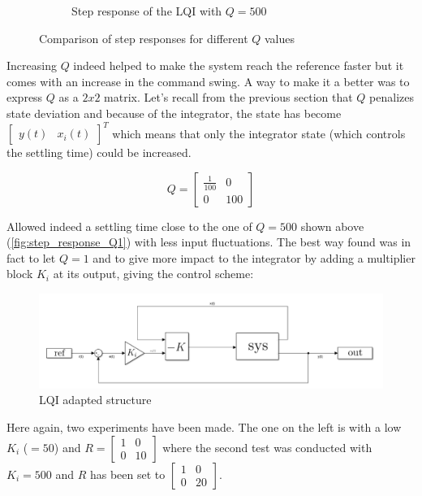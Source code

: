 \begin{figure}[H]
\begin{subfigure}[b]{0.5\textwidth}
        \caption{Step response of the LQI with $Q = 500$}
        \label{fig:step_response_Q500}
    \end{subfigure}
    \caption{Comparison of step responses for different $Q$ values}
    \label{fig:step_responses}
\end{figure}

Increasing $Q$ indeed helped to make the system reach the reference faster but it comes with an increase in the command
swing. A way to make it a better was to express $Q$ as a $2x2$ matrix. Let's recall from the previous section that $Q$
penalizes state deviation and because of the integrator, the state has become $\begin{bmatrix}y(t) & x_i(t)\end{bmatrix}
^T$ which means that only the integrator state (which controls the settling time) could be increased.

\begin{equation*}
    Q = \begin{bmatrix}
        \frac{1}{100} & 0\\
        0 & 100
    \end{bmatrix}
\end{equation*}

Allowed indeed a settling time close to the one of $Q = 500$ shown above (\ref{fig:step_response_Q1}) with
less input fluctuations. The best way found was in fact to let $Q = 1$ and to give more impact to the integrator by
adding a multiplier block $K_i$ at its output, giving the control scheme:

\begin{figure}[H]
    \centering
    \includegraphics[width = \textwidth]{Pictures/lqi_controller.png}
    \caption{LQI adapted structure}
    \label{fig:lqi modified}
\end{figure}

Here again, two experiments have been made. The one on the left is with a low $K_i$ ($= 50$) and $R = 
\begin{bmatrix}1&0\\0&10\end{bmatrix}$ where the second test was conducted with $K_i = 500$ and $R$ has been set to
$\begin{bmatrix}1&0\\0&20\end{bmatrix}$.


